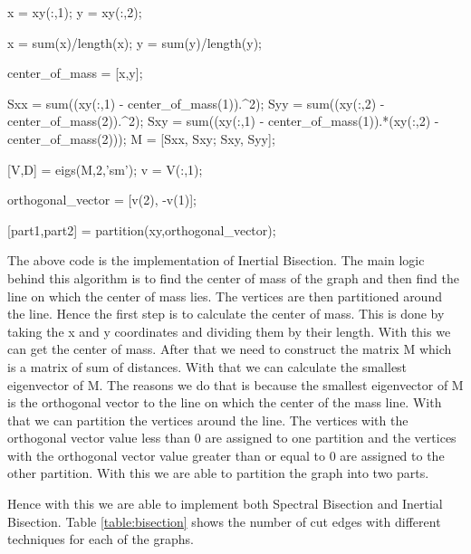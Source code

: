 \documentclass[unicode,11pt,a4paper,oneside,numbers=endperiod,openany]{scrartcl}
\begin{document}
\begin{mcode}
    x = xy(:,1);
    y = xy(:,2);

    x = sum(x)/length(x);
    y = sum(y)/length(y);

    center_of_mass = [x,y];


    Sxx = sum((xy(:,1) - center_of_mass(1)).^2);
    Syy = sum((xy(:,2) - center_of_mass(2)).^2);
    Sxy = sum((xy(:,1) - center_of_mass(1)).*(xy(:,2) - center_of_mass(2)));
    M = [Sxx, Sxy; Sxy, Syy];

    [V,D] = eigs(M,2,'sm');
    v = V(:,1);


    orthogonal_vector = [v(2), -v(1)];

    [part1,part2] = partition(xy,orthogonal_vector);
\end{mcode}

The above code is the implementation of Inertial Bisection. The main logic behind this algorithm is to find the center of mass of the graph and then find the line on which the center of mass lies. The vertices are then partitioned around the line. Hence the first step is to calculate the center of mass. This is done by taking the x and y coordinates and dividing them by their length. With this we can get the center of mass. After that we need to construct the matrix M which is a matrix of sum of distances. With that we can calculate the smallest eigenvector of M. The reasons we do that is because the smallest eigenvector of M is the orthogonal vector to the line on which the center of the mass line. With that we can partition the vertices around the line. The vertices with the orthogonal vector value less than 0 are assigned to one partition and the vertices with the orthogonal vector value greater than or equal to 0 are assigned to the other partition. With this we are able to partition the graph into two parts.

Hence with this we are able to implement both Spectral Bisection and Inertial Bisection. Table \ref{table:bisection} shows the number of cut edges with different techniques for each of the graphs.
\end{document}
